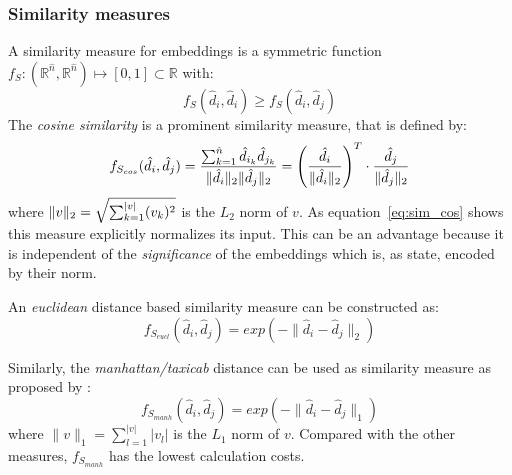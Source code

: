 \subsubsection{Similarity measures}
\label{subsec:similarity_measure}
A similarity measure for embeddings is a symmetric function $f_S: (\mathbb{R}^{\hat{n}}, \mathbb{R}^{\hat{n}}) \mapsto [0, 1] \subset \mathbb{R}$ with:
\begin{equation}
f_S(\hat{d}_i, \hat{d}_i) \geq f_S(\hat{d}_i, \hat{d}_j)
\end{equation}
The \textit{cosine similarity} is a prominent similarity measure, that is defined by:
\begin{equation} \label{eq:sim_cos}
f_{S_{cos}}(\hat{d}_i, \hat{d}_j) = \frac{\sum_{k=1}^{\hat{n}}\hat{d}_{i_k} \hat{d}_{j_k}}{\lVert\hat{d}_i\rVert_2 \lVert\hat{d}_j\rVert_2} = \left(\frac{\hat{d}_i}{\lVert\hat{d}_i\rVert_2}\right)^T \cdot \frac{\hat{d}_j}{\lVert\hat{d}_j\rVert_2}
\end{equation}
where $\lVert v\rVert_2 = \sqrt{\sum_{k=1}^{|v|}(v_k)^2}$ is the $L_2$ norm of $v$. As equation~\eqref{eq:sim_cos} shows this measure explicitly normalizes its input. This can be an advantage because it is independent of the \textit{significance} of the embeddings which is, as \textcite{schakel_measuring_2015} state, encoded by their norm.

An \textit{euclidean} distance based similarity measure can be constructed as:
\begin{equation}
f_{S_{eucl}}(\hat{d}_i, \hat{d}_j) = exp(-\lVert\hat{d}_i - \hat{d}_j\rVert_2)
\end{equation}


Similarly, the \textit{manhattan/taxicab} distance can be used as similarity measure as proposed by \textcite{mueller_siamese_2016}:
\begin{equation}
f_{S_{manh}}(\hat{d}_i, \hat{d}_j) = exp(-\lVert\hat{d}_i - \hat{d}_j\rVert_1)
\end{equation}
where $\lVert v\rVert_1 = \sum\limits_{l=1}^{|v|}|v_l|$ is the $L_1$ norm of $v$. Compared with the other measures, $f_{S_{manh}}$ has the lowest calculation costs. %

